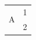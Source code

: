 \documentclass{standalone}
\begin{document}
\begin{tabular}{|c|c|}\hline\multirow{2}{*}{A}&1\\&2\\\hline\end{tabular}
\end{document}
